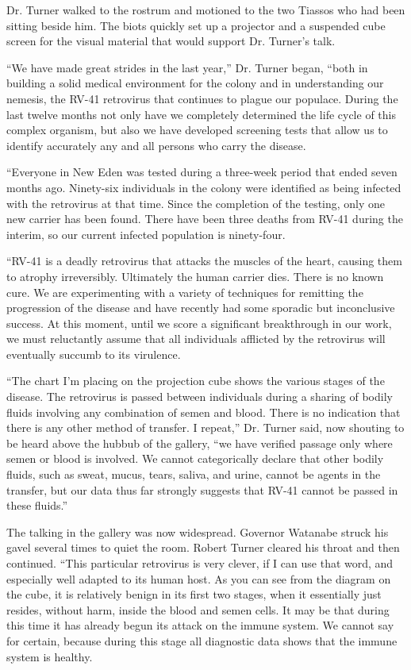 \documentclass[]{article}
\begin{document}
{Dr.  Turner walked to the rostrum and motioned to the two Tiassos who had been sitting beside him.  The biots quickly set up a projector and a suspended cube screen for the visual material that would support Dr.  Turner’s talk.

“We have made great strides in the last year,” Dr.  Turner began, “both in building a solid medical environment for the colony and in understanding our nemesis, the RV-41 retrovirus that continues to plague our populace.  During the last twelve months not only have we completely determined the life cycle of this complex organism, but also we have developed screening tests that allow us to identify accurately any and all persons who carry the disease.

“Everyone in New Eden was tested during a three-week period that ended seven months ago.  Ninety-six individuals in the colony were identified as being infected with the retrovirus at that time.  Since the completion of the testing, only one new carrier has been found.  There have been three deaths from RV-41 during the interim, so our current infected population is ninety-four.

“RV-41 is a deadly retrovirus that attacks the muscles of the heart, causing them to atrophy irreversibly.  Ultimately the human carrier dies.  There is no known cure.  We are experimenting with a variety of techniques for remitting the progression of the disease and have recently had some sporadic but inconclusive success.  At this moment, until we score a significant breakthrough in our work, we must reluctantly assume that all individuals afflicted by the retrovirus will eventually succumb to its virulence.

“The chart I’m placing on the projection cube shows the various stages of the disease.  The retrovirus is passed between individuals during a sharing of bodily fluids involving any combination of semen and blood.  There is no indication that there is any other method of transfer.  I repeat,” Dr.  Turner said, now shouting to be heard above the hubbub of the gallery, “we have verified passage only where semen or blood is involved.  We cannot categorically declare that other bodily fluids, such as sweat, mucus, tears, saliva, and urine, cannot be agents in the transfer, but our data thus far strongly suggests that RV-41 cannot be passed in these fluids.”

The talking in the gallery was now widespread.  Governor Watanabe struck his gavel several times to quiet the room.  Robert Turner cleared his throat and then continued.  “This particular retrovirus is very clever, if I can use that word, and especially well adapted to its human host.  As you can see from the diagram on the cube, it is relatively benign in its first two stages, when it essentially just resides, without harm, inside the blood and semen cells.  It may be that during this time it has already begun its attack on the immune system.  We cannot say for certain, because during this stage all diagnostic data shows that the immune system is healthy.

}
\end{document}
